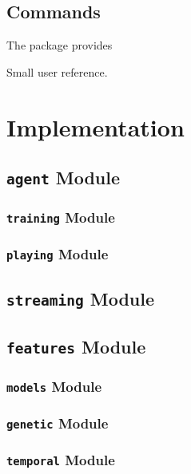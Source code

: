 \subsection{Commands}

The package provides

Small user reference.


\section{Implementation}

\label{sec:implementation}

\subsection{\texttt{agent} Module}

\label{sec:impl-agent}

\subsubsection{\texttt{training} Module}
\subsubsection{\texttt{playing} Module}

\subsection{\texttt{streaming} Module}
\subsection{\texttt{features} Module}
\subsubsection{\texttt{models} Module}
\subsubsection{\texttt{genetic} Module}
\subsubsection{\texttt{temporal} Module}


